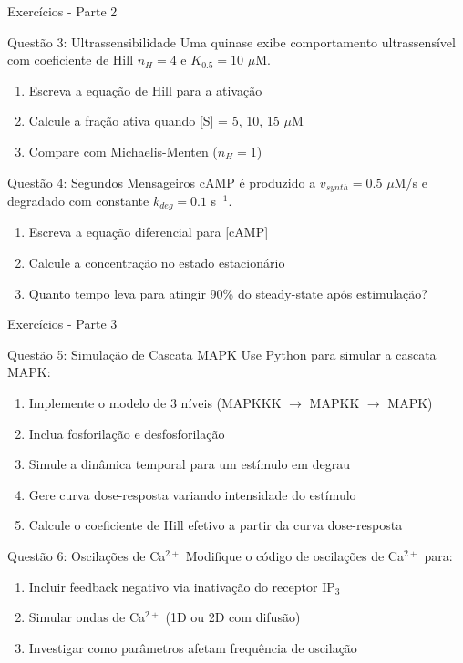 \begin{frame}{Exercícios - Parte 2}
\begin{block}{Questão 3: Ultrassensibilidade}
Uma quinase exibe comportamento ultrassensível com coeficiente de Hill $n_H = 4$ e $K_{0.5} = 10$ $\mu$M.
\begin{enumerate}
    \item Escreva a equação de Hill para a ativação
    \item Calcule a fração ativa quando [S] = 5, 10, 15 $\mu$M
    \item Compare com Michaelis-Menten ($n_H = 1$)
\end{enumerate}
\end{block}

\begin{block}{Questão 4: Segundos Mensageiros}
cAMP é produzido a $v_{synth} = 0.5$ $\mu$M/s e degradado com constante $k_{deg} = 0.1$ s$^{-1}$.
\begin{enumerate}
    \item Escreva a equação diferencial para [cAMP]
    \item Calcule a concentração no estado estacionário
    \item Quanto tempo leva para atingir 90\% do steady-state após estimulação?
\end{enumerate}
\end{block}
\end{frame}

\begin{frame}{Exercícios - Parte 3}
\begin{alertblock}{Questão 5: Simulação de Cascata MAPK}
Use Python para simular a cascata MAPK:
\begin{enumerate}
    \item Implemente o modelo de 3 níveis (MAPKKK $\rightarrow$ MAPKK $\rightarrow$ MAPK)
    \item Inclua fosforilação e desfosforilação
    \item Simule a dinâmica temporal para um estímulo em degrau
    \item Gere curva dose-resposta variando intensidade do estímulo
    \item Calcule o coeficiente de Hill efetivo a partir da curva dose-resposta
\end{enumerate}
\end{alertblock}

\begin{block}{Questão 6: Oscilações de Ca$^{2+}$}
Modifique o código de oscilações de Ca$^{2+}$ para:
\begin{enumerate}
    \item Incluir feedback negativo via inativação do receptor IP$_3$
    \item Simular ondas de Ca$^{2+}$ (1D ou 2D com difusão)
    \item Investigar como parâmetros afetam frequência de oscilação
\end{enumerate}
\end{block}
\end{frame}

